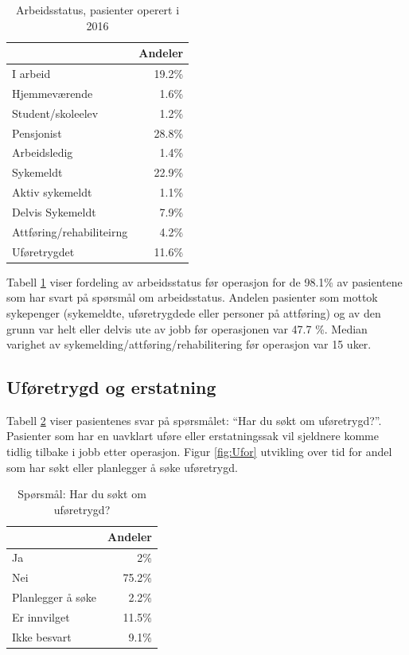 \documentclass [norsk,a4paper,twoside]{article}\usepackage[]{graphicx}\usepackage[]{color}
\begin{document}
\begin{table}[ht]
\centering
\begin{tabular}{lr}
  \hline
 & Andeler \\ 
  \hline
I arbeid & 19.2\% \\ 
  Hjemmeværende & 1.6\% \\ 
  Student/skoleelev & 1.2\% \\ 
  Pensjonist & 28.8\% \\ 
  Arbeidsledig & 1.4\% \\ 
  Sykemeldt & 22.9\% \\ 
  Aktiv sykemeldt & 1.1\% \\ 
  Delvis Sykemeldt & 7.9\% \\ 
  Attføring/rehabiliteirng & 4.2\% \\ 
  Uføretrygdet & 11.6\% \\ 
   \hline
\end{tabular}
\caption{Arbeidsstatus, pasienter operert i 2016} 
\label{tab:Arb}
\end{table}


Tabell \ref{tab:Arb} viser fordeling av arbeidsstatus før operasjon for de 98.1\% 
av pasientene som har svart på spørsmål om arbeidsstatus.
Andelen pasienter som mottok sykepenger (sykemeldte, uføretrygdede eller personer 
på attføring) og av den grunn var helt eller delvis ute av jobb før operasjonen var 
47.7 \%. 
Median varighet av sykemelding/attføring/rehabilitering  før operasjon var 
15 uker.


\clearpage


\subsection{Uføretrygd og erstatning }

Tabell \ref{tab:Ufor} viser pasientenes svar på spørsmålet: ``Har du søkt om uføretrygd?''.
Pasienter som har en uavklart uføre eller erstatningssak vil sjeldnere komme tidlig tilbake i jobb etter operasjon.
Figur \ref{fig:Ufor} utvikling over tid for andel som har søkt eller planlegger å søke uføretrygd.

\begin{table}[ht]
\centering
\begin{tabular}{lr}
  \hline
 & Andeler \\ 
  \hline
Ja & 2\% \\ 
  Nei & 75.2\% \\ 
  Planlegger å søke & 2.2\% \\ 
  Er innvilget & 11.5\% \\ 
  Ikke besvart & 9.1\% \\ 
   \hline
\end{tabular}
\caption{Spørsmål: Har du søkt om uføretrygd?} 
\label{tab:Ufor}
\end{table}
\end{document}
